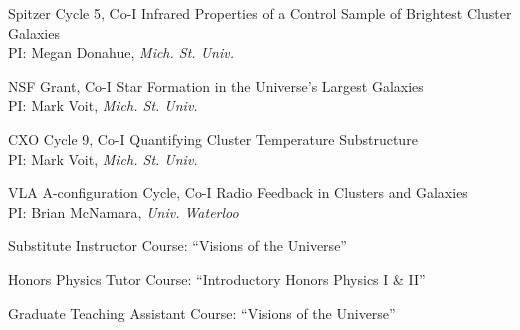 \documentclass[12pt]{cv}
\begin{document}
\begin{llist}
Spitzer Cycle 5, Co-I
Infrared Properties of a Control Sample of Brightest Cluster Galaxies\\%
PI: Megan Donahue, {\textit{Mich. St. Univ.}}

NSF Grant, Co-I
Star Formation in the Universe's Largest Galaxies\\%
PI: Mark Voit, {\textit{Mich. St. Univ.}}

CXO Cycle 9, Co-I
Quantifying Cluster Temperature Substructure\\%
PI: Mark Voit, {\textit{Mich. St. Univ.}}

VLA A-configuration Cycle, Co-I
Radio Feedback in Clusters and Galaxies\\%
PI: Brian McNamara, {\textit{Univ. Waterloo}}





Substitute Instructor
Course: ``Visions of the Universe''

Honors Physics Tutor
Course: ``Introductory Honors Physics I \& II''

Graduate Teaching Assistant
Course: ``Visions of the Universe''




\end{llist}
\end{document}
